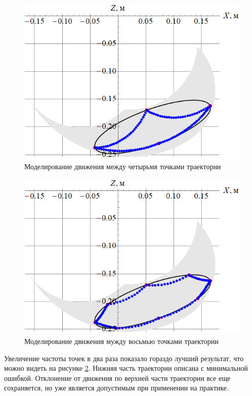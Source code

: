 \begin{figure}[h]
    \centering
    \includegraphics[scale=0.6]{chapter_walking_model/figure6.png}
    \caption{Моделирование движения между четырьмя точками траектории}
    \label{fig:traj2}
\end{figure}

\begin{figure}[h!]
    \centering
    \includegraphics[scale=0.6]{chapter_walking_model/figure7.png}
    \caption{Моделирование движения мужду восьмью точками траектории}
    \label{fig:traj3}
\end{figure}

Увеличение частоты точек в два раза показало гораздо лучший результат, что можно видеть на рисунке \ref{fig:traj3}. Нижняя часть траектории описана с минимальной ошибкой. Отклонение от движения по верхней части траектории все еще сохраняется, но уже является допустимым при применении на практике.

